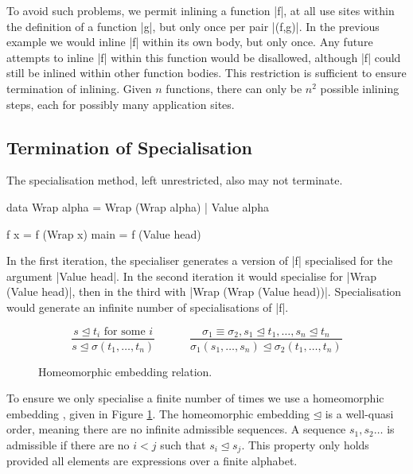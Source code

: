 \documentclass[preprint]{sigplanconf}
\begin{document}
To avoid such problems, we permit inlining a function |f|, at all use sites within the definition of a function |g|, but only once per pair |(f,g)|. In the previous example we would inline |f| within its own body, but only once. Any future attempts to inline |f| within this function would be disallowed, although |f| could still be inlined within other function bodies. This restriction is sufficient to ensure termination of inlining. Given $n$ functions, there can only be $n^2$ possible inlining steps, each for possibly many application sites.


\subsection{Termination of Specialisation}
\label{sec:termination_specialisation}

The specialisation method, left unrestricted, also may not terminate.

\begin{example}
\label{ex:wrap}
\begin{code}
data Wrap alpha = Wrap (Wrap alpha) | Value alpha

f x = f (Wrap x)
main = f (Value head)
\end{code}

In the first iteration, the specialiser generates a version of |f| specialised for the argument |Value head|. In the second iteration it would specialise for |Wrap (Value head)|, then in the third with |Wrap (Wrap (Value head))|. Specialisation would generate an infinite number of specialisations of |f|.
\end{example}

\begin{figure}
\begin{equation*}
\frac{s \unlhd t_i \text{ for some } i}{s \unlhd \sigma(t_1,\ldots,t_n)}
\;\;\;\;\;\;\;\;\;\;\;
\frac{\sigma_1 \equiv \sigma_2,
        s_1 \unlhd t_1, \ldots , s_n \unlhd t_n}
       {\sigma_1 (s_1,\ldots,s_n) \unlhd \sigma_2 (t_1,\ldots,t_n)}
\end{equation*}
\caption{Homeomorphic embedding relation.}
\label{fig:homeomorphic}
\end{figure}


To ensure we only specialise a finite number of times we use a homeomorphic embedding \cite{leuschel:homeomorphic}, given in Figure \ref{fig:homeomorphic}. The homeomorphic embedding $\unlhd$ is a well-quasi order, meaning there are no infinite admissible sequences. A sequence $s_1,s_2 \ldots$ is admissible if there are no $i < j$ such that $s_i \unlhd s_j$. This property only holds provided all elements are expressions over a finite alphabet.
\end{document}
